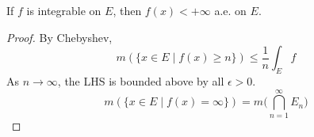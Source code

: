  \begin{theorem}
    If $f$ is integrable on $E$, then $f(x) < +\infty$ a.e. on $E$. 
  \end{theorem}
  \begin{proof}
    By Chebyshev, 
    \begin{equation}
      m( \{x \in E \mid f(x) \geq n \}) \leq \frac{1}{n} \int_E f 
    \end{equation}
    As $n \to \infty$, the LHS is bounded above by all $\epsilon > 0$. 
    \begin{equation}
      m( \{x \in E \mid f(x) = \infty \}) = m \bigg( \bigcap_{n=1}^\infty E_n \bigg)
    \end{equation}
  \end{proof} 

